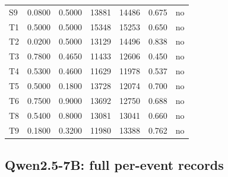 \begin{table}[!htbp]
\begin{tabular}{lrrrrrl}
S9 & 0.0800 & 0.5000 & 13881 & 14486 & 0.675 & no \\
T1 & 0.5000 & 0.5000 & 15348 & 15253 & 0.650 & no \\
T2 & 0.0200 & 0.5000 & 13129 & 14496 & 0.838 & no \\
T3 & 0.7800 & 0.4650 & 11433 & 12606 & 0.450 & no \\
T4 & 0.5300 & 0.4600 & 11629 & 11978 & 0.537 & no \\
T5 & 0.5000 & 0.1800 & 13728 & 12074 & 0.700 & no \\
T6 & 0.7500 & 0.9000 & 13692 & 12750 & 0.688 & no \\
T8 & 0.5400 & 0.8000 & 13081 & 13041 & 0.660 & no \\
T9 & 0.1800 & 0.3200 & 11980 & 13388 & 0.762 & no \\
\bottomrule
\end{tabular}
\end{table}


\clearpage\subsection{Qwen2.5-7B: full per-event records}

